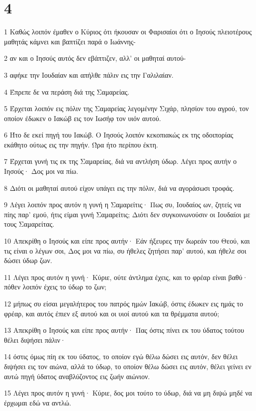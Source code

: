 \chapter{4}

\par 1 Καθώς λοιπόν έμαθεν ο Κύριος ότι ήκουσαν οι Φαρισαίοι ότι ο Ιησούς πλειοτέρους μαθητάς κάμνει και βαπτίζει παρά ο Ιωάννης-
\par 2 αν και ο Ιησούς αυτός δεν εβάπτιζεν, αλλ' οι μαθηταί αυτού-
\par 3 αφήκε την Ιουδαίαν και απήλθε πάλιν εις την Γαλιλαίαν.
\par 4 Έπρεπε δε να περάση διά της Σαμαρείας.
\par 5 Έρχεται λοιπόν εις πόλιν της Σαμαρείας λεγομένην Σιχάρ, πλησίον του αγρού, τον οποίον έδωκεν ο Ιακώβ εις τον Ιωσήφ τον υιόν αυτού.
\par 6 Ήτο δε εκεί πηγή του Ιακώβ. Ο Ιησούς λοιπόν κεκοπιακώς εκ της οδοιπορίας εκάθητο ούτως εις την πηγήν. Ώρα ήτο περίπου έκτη.
\par 7 Έρχεται γυνή τις εκ της Σαμαρείας, διά να αντλήση ύδωρ. Λέγει προς αυτήν ο Ιησούς· Δος μοι να πίω.
\par 8 Διότι οι μαθηταί αυτού είχον υπάγει εις την πόλιν, διά να αγοράσωσι τροφάς.
\par 9 Λέγει λοιπόν προς αυτόν η γυνή η Σαμαρείτις· Πως συ, Ιουδαίος ων, ζητείς να πίης παρ' εμού, ήτις είμαι γυνή Σαμαρείτις; Διότι δεν συγκοινωνούσιν οι Ιουδαίοι με τους Σαμαρείτας.
\par 10 Απεκρίθη ο Ιησούς και είπε προς αυτήν· Εάν ήξευρες την δωρεάν του Θεού, και τις είναι ο λέγων σοι, Δος μοι να πίω, συ ήθελες ζητήσει παρ' αυτού, και ήθελε σοι δώσει ύδωρ ζων.
\par 11 Λέγει προς αυτόν η γυνή· Κύριε, ούτε άντλημα έχεις, και το φρέαρ είναι βαθύ· πόθεν λοιπόν έχεις το ύδωρ το ζων;
\par 12 μήπως συ είσαι μεγαλήτερος του πατρός ημών Ιακώβ, όστις έδωκεν εις ημάς το φρέαρ, και αυτός έπιεν εξ αυτού και οι υιοί αυτού και τα θρέμματα αυτού;
\par 13 Απεκρίθη ο Ιησούς και είπε προς αυτήν· Πας όστις πίνει εκ του ύδατος τούτου θέλει διψήσει πάλιν·
\par 14 όστις όμως πίη εκ του ύδατος, το οποίον εγώ θέλω δώσει εις αυτόν, δεν θέλει διψήσει εις τον αιώνα, αλλά το ύδωρ, το οποίον θέλω δώσει εις αυτόν, θέλει γείνει εν αυτώ πηγή ύδατος αναβλύζοντος εις ζωήν αιώνιον.
\par 15 Λέγει προς αυτόν η γυνή· Κύριε, δος μοι τούτο το ύδωρ, διά να μη διψώ μηδέ να έρχωμαι εδώ να αντλώ.
